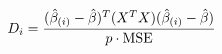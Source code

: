\documentclass[preview]{standalone}
\begin{document}
\begin{align*}
\special{dvisvgm:raw <g id='unique000'>}D_i = \frac{(\hat{\beta}_{(i)} - \hat{\beta})^T (X^T X)(\hat{\beta}_{(i)} - \hat{\beta})}{p \cdot \text{MSE}}\special{dvisvgm:raw </g>}
\end{align*}
\end{document}

